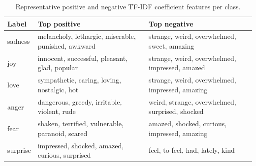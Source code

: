 \begin{table}
\caption{Representative positive and negative TF-IDF coefficient features per class.}
\label{tab:tfidf-positive-negative}
\begin{tabular}{lll}
\toprule
Label & Top positive & Top negative \\
\midrule
sadness & melancholy, lethargic, miserable, punished, awkward & strange, weird, overwhelmed, sweet, amazing \\
joy & innocent, successful, pleasant, glad, popular & strange, weird, overwhelmed, impressed, amazed \\
love & sympathetic, caring, loving, nostalgic, hot & strange, weird, overwhelmed, impressed, amazing \\
anger & dangerous, greedy, irritable, violent, rude & weird, strange, overwhelmed, surprised, shocked \\
fear & shaken, terrified, vulnerable, paranoid, scared & amazed, shocked, curious, impressed, amazing \\
surprise & impressed, shocked, amazed, curious, surprised & feel, to feel, had, lately, kind \\
\bottomrule
\end{tabular}
\end{table}
